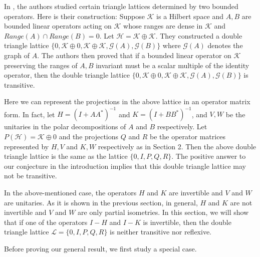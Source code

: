 \documentclass{jaums}
\theoremstyle{thmit} %
\theoremstyle{thmrm} %
\begin{document}
In {\cite{[HLP]}}, the authors studied certain triangle lattices determined by
two bounded operators. Here is their construction: Suppose $\mathcal{K}$ is a
Hilbert space and $A, B$ are bounded linear operators acting on $\mathcal{K}$
whose ranges are dense in $\mathcal{K}$ and $Range(A)\cap Range(B)=0$.
Let $\mathcal{H}=\mathcal{K}\oplus\mathcal{K}$.
They constructed a double triangle lattice
$\{0,\mathcal{K}\oplus 0,
\mathcal{K}\oplus\mathcal{K},\mathcal{G}(A),\mathcal{G}(B)\}$ where
$\mathcal{G}(A)$ denotes the graph of $A$. The authors then proved that
if a bounded linear operator on $\mathcal{K}$ preserving the ranges of $A,B$
invariant must be a scalar multiple of the identity operator, then the double
triangle lattice
$\{0,\mathcal{K}\oplus 0,
\mathcal{K}\oplus\mathcal{K},\mathcal{G}(A),\mathcal{G}(B)\}$ is transitive.

Here we can represent the projections in the above lattice in an operator matrix
form. In fact, let
$H=(I+AA^*)^{-1}$ and $K=(I+BB^*)^{-1}$, and $V,W$ be the unitaries in the
polar decompositions of $A$
and $B$ respectively. Let $P(\mathcal{H})=\mathcal{K}\oplus 0$ and the
projections $Q$ and $R$ be the operator matrices represented by $H,V$ and $K,W$
respectively as in Section 2. Then the above
double triangle lattice is the same as the lattice $\{0,I,P,Q,R\}$. The positive
answer to our conjecture in the introduction implies that this double triangle
lattice may not be transitive.

In the above-mentioned case, the operators $H$ and $K$ are invertible and $V$
and $W$ are unitaries. As it is shown in the previous section,
in general, $H$ and $K$ are not invertible and $V$ and $W$ are only partial
isometries. In this section,
we will show that if one of the operators $I-H$ and $I-K$ is invertible, then
the double triangle lattice $\mathcal{L}=\{0,I,P,Q,R\}$ is neither transitive
nor reflexive.

Before proving our general result, we first study a special case.
\end{document}
